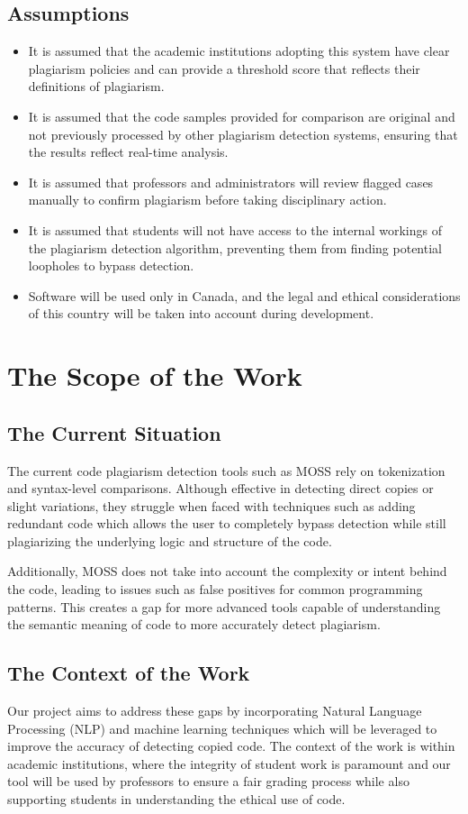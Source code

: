 \documentclass[12pt]{article}
\begin{document}
\subsection{Assumptions}
\begin{itemize}
  \item It is assumed that the academic institutions adopting this system have clear plagiarism policies and can provide a threshold score that reflects their definitions of plagiarism.
  \item It is assumed that the code samples provided for comparison are original and not previously processed by other plagiarism detection systems, ensuring that the results reflect real-time analysis.
  \item It is assumed that professors and administrators will review flagged cases manually to confirm plagiarism before taking disciplinary action.
  \item It is assumed that students will not have access to the internal workings of the plagiarism detection algorithm, preventing them from finding potential loopholes to bypass detection.
  \item Software will be used only in Canada, and the legal and ethical considerations of this country will be taken into account during development.
\end{itemize}

\section{The Scope of the Work}
\subsection{The Current Situation}
The current code plagiarism detection tools such as MOSS rely on tokenization and syntax-level comparisons. Although effective
in detecting direct copies or slight variations, they struggle when faced with techniques such as adding redundant code which
allows the user to completely bypass detection while still plagiarizing the underlying logic and structure of the code.

Additionally, MOSS does not take into account the complexity or intent behind the code, leading to issues such as false
positives for common programming patterns. This creates a gap for more advanced tools capable of understanding the semantic 
meaning of code to more accurately detect plagiarism.
\subsection{The Context of the Work}
Our project aims to address these gaps by incorporating Natural Language Processing (NLP) and machine learning techniques
which will be leveraged to improve the accuracy of detecting copied code. The context of the work is within academic institutions,
where the integrity of student work is paramount and our tool will be used by professors to ensure a fair grading process
while also supporting students in understanding the ethical use of code.
\end{document}
